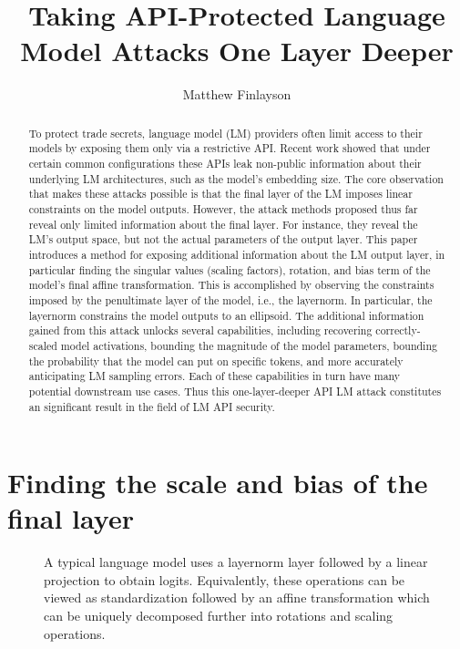 \documentclass{article}
\author{Matthew Finlayson}
\title{Taking API-Protected Language Model Attacks One Layer Deeper}
\date{}
\begin{document}
\maketitle

\begin{abstract}
  To protect trade secrets, 
  language model (LM) providers often limit access to their models
  by exposing them only via a restrictive API.
  Recent work showed that under certain common configurations 
  these APIs leak non-public information 
  about their underlying LM architectures,
  such as the model's embedding size.
  The core observation that makes these attacks possible
  is that the final layer of the LM imposes linear constraints
  on the model outputs.
  However, the attack methods proposed thus far reveal only limited information 
  about the final layer.
  For instance, they reveal the LM's output space,
  but not the actual parameters of the output layer.
  This paper introduces a method 
  for exposing additional information about the LM output layer,
  in particular finding the singular values (scaling factors),
  rotation, and bias term of the model's final affine transformation.
  This is accomplished by observing the constraints 
  imposed by the penultimate layer of the model, i.e., the layernorm.
  In particular, the layernorm constrains the model outputs to an ellipsoid.
  The additional information gained from this attack unlocks several capabilities,
  including recovering correctly-scaled model activations,
  bounding the magnitude of the model parameters,
  bounding the probability that the model can put on specific tokens,
  and more accurately anticipating LM sampling errors.
  Each of these capabilities in turn have many potential downstream use cases.
  Thus this one-layer-deeper API LM attack 
  constitutes an significant result in the field of LM API security.
\end{abstract}

\section{Finding the scale and bias of the final layer}

\begin{figure}
  \centering
  \small
  
  \caption{
    A typical language model uses a layernorm layer followed by a linear projection to obtain logits.
    Equivalently, these operations can be viewed as standardization followed by an affine transformation which can be uniquely decomposed further into rotations and scaling operations.
  }
\end{figure}
\end{document}
